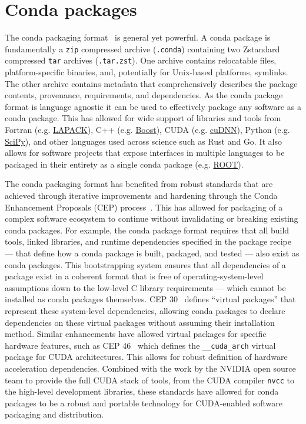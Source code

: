 \section{Conda packages}\label{sec:conda-packages}

The conda packaging format~\cite{conda_software} is general yet powerful.
A conda package is fundamentally a \texttt{zip} compressed archive (\texttt{.conda}) containing two Zstandard compressed \texttt{tar} archives (\texttt{.tar.zst}).
One archive contains relocatable files, platform-specific binaries, and, potentially for Unix-based platforms, symlinks.
The other archive contains metadata that comprehensively describes the package contents, provenance, requirements, and dependencies.
As the conda package format is language agnostic it can be used to effectively package any software as a conda package.
This has allowed for wide support of libraries and tools from Fortran (e.g. \href{https://github.com/conda-forge/lapack-feedstock}{LAPACK}), C++ (e.g. \href{https://github.com/conda-forge/boost-feedstock}{Boost}), CUDA (e.g. \href{https://github.com/conda-forge/cudnn-feedstock}{cuDNN}), Python (e.g. \href{https://github.com/conda-forge/scipy-feedstock}{SciPy}), and other languages used across science such as Rust and Go.
It also allows for software projects that expose interfaces in multiple languages to be packaged in their entirety as a single conda package (e.g. \href{https://github.com/conda-forge/root-feedstock}{ROOT}).

The conda packaging format has benefited from robust standards that are achieved through iterative improvements and hardening through the Conda Enhancement Proposals (CEP) process~\cite{CEPs}.
This has allowed for packaging of a complex software ecosystem to continue without invalidating or breaking existing conda packages.
For example, the conda package format requires that all build tools, linked libraries, and runtime dependencies specified in the package recipe --- that define how a conda package is built, packaged, and tested --- also exist as conda packages.
This bootstrapping system ensures that all dependencies of a package exist in a coherent format that is free of operating-system-level assumptions down to the low-level C library requirements --- which cannot be installed as conda packages themselves.
CEP 30~\cite{CEP30} defines ``virtual packages'' that represent these system-level dependencies, allowing conda packages to declare dependencies on these virtual packages without assuming their installation method.
Similar enhancements have allowed virtual packages for specific hardware features, such as CEP 46~\cite{CEP46} which defines the \texttt{\_\_cuda\_arch} virtual package for CUDA architectures.
This allows for robust definition of hardware acceleration dependencies.
Combined with the work by the NVIDIA open source team to provide the full CUDA stack of tools, from the CUDA compiler \texttt{nvcc} to the high-level development libraries, these standards have allowed for conda packages to be a robust and portable technology for CUDA-enabled software packaging and distribution.

